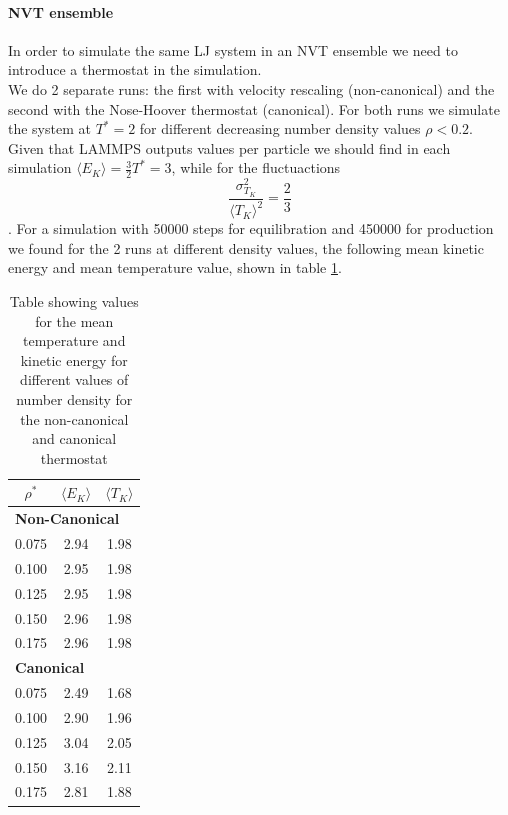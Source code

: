 \paragraph{NVT ensemble} In order to simulate the same LJ system in an NVT ensemble we need to introduce a thermostat in the simulation. \\
We do 2 separate runs: the first with velocity rescaling (non-canonical) and the second with the Nose-Hoover thermostat (canonical). For both runs we simulate the system at $T^* = 2$ for different decreasing number density values $\rho < 0.2$. \\
Given that LAMMPS outputs values per particle we should find in each simulation $\langle E_K \rangle = \frac{3}{2} T^* = 3$, while for the fluctuactions $$ \frac{\sigma^2_{T_K}}{\langle T_K \rangle^2} = \frac{2}{3}$$.
For a simulation with 50000 steps for equilibration and 450000 for production we found for the 2 runs at different density values, the following mean kinetic energy and mean temperature value, shown in table \ref{ex10:table}.


\begin{table}[ht]
    \centering
    \begin{tabular}{c|cc}
        \toprule
        \( \rho^* \) & \( \langle E_K \rangle \) & \( \langle T_K \rangle \) \\
        \midrule
        \multicolumn{3}{l}{\textbf{Non-Canonical}} \\
        0.075 & 2.94 & 1.98 \\
        0.100 & 2.95 & 1.98 \\
        0.125 & 2.95 & 1.98 \\
        0.150 & 2.96 & 1.98 \\
        0.175 & 2.96 & 1.98 \\
        \midrule
        \multicolumn{3}{l}{\textbf{Canonical}} \\
        0.075 & 2.49 & 1.68 \\
        0.100 & 2.90 & 1.96\\
        0.125 & 3.04 & 2.05\\
        0.150 & 3.16 & 2.11 \\
        0.175 & 2.81 & 1.88 \\
        \bottomrule
    \end{tabular}
    \caption{Table showing values for the mean temperature and kinetic energy for different values of number density for the non-canonical and canonical thermostat}
    \label{ex10:table}
\end{table}
